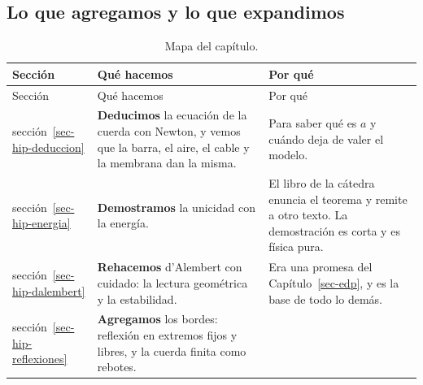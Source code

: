 \documentclass[
  spanish,
  a4paper,
]{scrbook}
\theoremstyle{definition}
\theoremstyle{plain}
\theoremstyle{definition}
\theoremstyle{plain}
\theoremstyle{definition}
\theoremstyle{remark}
\begin{document}
\subsection{Lo que agregamos y lo que
expandimos}\label{sec-hip-agregamos}

\begin{longtable}[]{@{}
  >{\raggedright\arraybackslash}p{}
  >{\raggedright\arraybackslash}p{}
  >{\raggedright\arraybackslash}p{}@{}}
\caption{Mapa del capítulo.}\label{tbl-hip-mapa}\tabularnewline
\toprule\noalign{}
\begin{minipage}[b]{\linewidth}\raggedright
Sección
\end{minipage} & \begin{minipage}[b]{\linewidth}\raggedright
Qué hacemos
\end{minipage} & \begin{minipage}[b]{\linewidth}\raggedright
Por qué
\end{minipage} \\
\midrule\noalign{}
\endfirsthead
\toprule\noalign{}
\begin{minipage}[b]{\linewidth}\raggedright
Sección
\end{minipage} & \begin{minipage}[b]{\linewidth}\raggedright
Qué hacemos
\end{minipage} & \begin{minipage}[b]{\linewidth}\raggedright
Por qué
\end{minipage} \\
\midrule\noalign{}
\endhead
\bottomrule\noalign{}
\endlastfoot
sección~\ref{sec-hip-deduccion} & \textbf{Deducimos} la ecuación de la
cuerda con Newton, y vemos que la barra, el aire, el cable y la membrana
dan la misma. & Para saber qué es \(a\) y cuándo deja de valer el
modelo. \\
sección~\ref{sec-hip-energia} & \textbf{Demostramos} la unicidad con la
energía. & El libro de la cátedra enuncia el teorema y remite a otro
texto. La demostración es corta y es física pura. \\
sección~\ref{sec-hip-dalembert} & \textbf{Rehacemos} d'Alembert con
cuidado: la lectura geométrica y la estabilidad. & Era una promesa del
Capítulo~\ref{sec-edp}, y es la base de todo lo demás. \\
sección~\ref{sec-hip-reflexiones} & \textbf{Agregamos} los bordes:
reflexión en extremos fijos y libres, y la cuerda finita como rebotes. &

\end{longtable}
\end{document}
